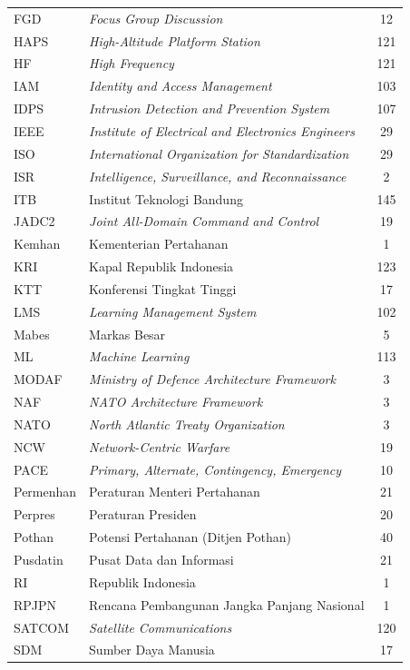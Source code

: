 \begin{longtable}{@{} l >{\raggedright\arraybackslash}p{7.2cm} c @{}}
FGD & \textit{Focus Group Discussion} & 12 \\
HAPS & \textit{High-Altitude Platform Station} & 121 \\
HF & \textit{High Frequency} & 121 \\
IAM & \textit{Identity and Access Management} & 103 \\
IDPS & \textit{Intrusion Detection and Prevention System} & 107 \\
IEEE & \textit{Institute of Electrical and Electronics Engineers} & 29 \\
ISO & \textit{International Organization for Standardization} & 29 \\
ISR & \textit{Intelligence, Surveillance, and Reconnaissance} & 2 \\
ITB & Institut Teknologi Bandung & 145 \\
JADC2 & \textit{Joint All-Domain Command and Control} & 19 \\
Kemhan & Kementerian Pertahanan & 1 \\
KRI & Kapal Republik Indonesia & 123 \\
KTT & Konferensi Tingkat Tinggi & 17 \\
LMS & \textit{Learning Management System} & 102 \\
Mabes & Markas Besar & 5 \\
ML & \textit{Machine Learning} & 113 \\
MODAF & \textit{Ministry of Defence Architecture Framework} & 3 \\
NAF & \textit{NATO Architecture Framework} & 3 \\
NATO & \textit{North Atlantic Treaty Organization} & 3 \\
NCW & \textit{Network-Centric Warfare} & 19 \\
PACE & \textit{Primary, Alternate, Contingency, Emergency} & 10 \\
Permenhan & Peraturan Menteri Pertahanan & 21 \\
Perpres & Peraturan Presiden & 20 \\
Pothan & Potensi Pertahanan (Ditjen Pothan) & 40 \\
Pusdatin & Pusat Data dan Informasi & 21 \\
RI & Republik Indonesia & 1 \\
RPJPN & Rencana Pembangunan Jangka Panjang Nasional & 1 \\
SATCOM & \textit{Satellite Communications} & 120 \\
SDM & Sumber Daya Manusia & 17 \\

\end{longtable}
